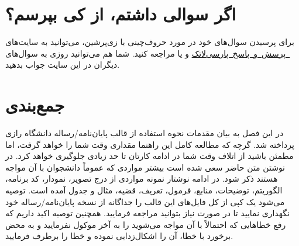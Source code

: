 \section{اگر سوالی داشتم، از کی بپرسم؟}
 برای پرسیدن سوال‌های خود در مورد حروف‌چینی با زی‌پرشین،  می‌توانید به سایت‌های 
\hbox{\href{http://qa.parsilatex.com}{ پرسش و پاسخ پارسی‌لاتک}}%
و یا 
\hbox{\href{https://tex.stackexchange.com/questions}{}}%
مراجعه کنید. شما هم می‌توانید روزی به سوال‌های دیگران در این سایت جواب بدهید.

\section{جمع‌بندی}
در این فصل به بیان مقدمات نحوه استفاده از قالب پایان‌نامه/رساله دانشگاه رازی پرداخته شد. 
گرچه که مطالعه کامل این راهنما مقداری وقت شما را خواهد گرفت، اما مطمئن باشید از اتلاف وقت شما در ادامه کارتان تا حد زیادی جلوگیری خواهد کرد. 
در نوشتن متن حاضر سعی شده است بیشتر مواردی که عموماً دانشجوان با آن مواجه هستند ذکر شود. 
در ادامه نوشتار نمونه مواردی از درج تصویر، نمودار، کد برنامه، الگوریتم، توضیحات، منابع، فرمول، تعریف، قضیه، مثال و جدول آمده است. 
توصیه می‌شود یک کپی از کل فایل‌های این قالب را جداگانه از نسخه پایان‌نامه/رساله خود نگهداری نمایید تا در صورت نیاز بتوانید مراجعه فرمایید. 
همچنین توصیه اکید داریم که رفع خطاهایی که احتمالاً با آن مواجه می‌شوید را به آخر موکول نفرمایید و به محض برخورد با خطا، آن را اشکال‌زدایی نموده و 
خطا را برطرف فرمایید.

